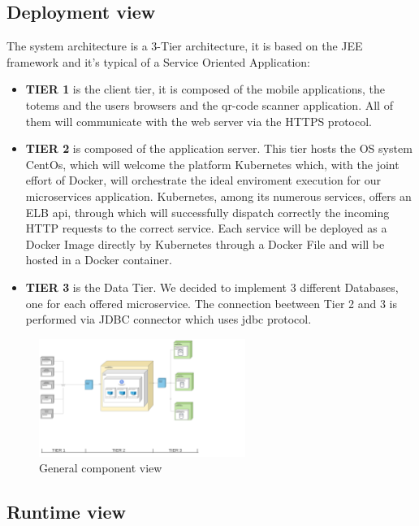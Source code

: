 \subsection{Deployment view}
\label{subsect:deploymentview}
The system architecture is a 3-Tier architecture, it is based on the JEE framework and it's typical of a Service Oriented Application:
\begin{itemize}
    \item \textbf{TIER 1} is the client tier, it is composed of the mobile applications, the totems and the users browsers and the qr-code scanner application. All of them will communicate with the web server via the HTTPS protocol.
    \item \textbf{TIER 2} is composed of the application server. This tier hosts the OS system CentOs, which will welcome the platform Kubernetes which, with the joint effort of Docker, will orchestrate the ideal enviroment execution for our microservices application. Kubernetes, among its numerous services, offers an ELB api, through which will successfully dispatch correctly the incoming HTTP requests to the correct service. Each service will be deployed as a Docker Image directly by Kubernetes through a Docker File and will be hosted in a Docker container.
    \item \textbf{TIER 3} is the Data Tier. 
    We decided to implement 3 different Databases, one for each offered microservice. 
    The connection beetween Tier 2 and 3 is performed via JDBC connector which uses jdbc protocol.
\end{itemize}
\begin{figure}[h!]
    \centering
    \includegraphics[width=0.6\textwidth]{Images/Deployement View (2).png}
    \caption{\label{fig:Deployement View}{General component view}}
\end{figure}


\subsection{Runtime view}
\label{subsect:runtimeview}


